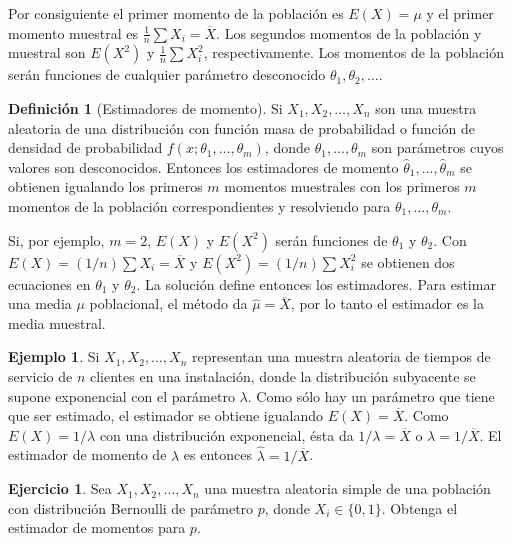 \documentclass[
  11pt,
]{book}
\theoremstyle{definition}
\newtheorem{definition}{Definición}[chapter]
\theoremstyle{definition}
\newtheorem{example}{Ejemplo}[chapter]
\theoremstyle{definition}
\newtheorem{exercise}{Ejercicio}[chapter]
\theoremstyle{definition}
\theoremstyle{remark}
\begin{document}
Por consiguiente el primer momento de la población es \(E(X) = \mu\) y el primer momento muestral es \(\frac{1}{n} \sum X_i = \overline{X}\). Los segundos momentos de la población y muestral son \(E(X^2)\) y \(\frac{1}{n} \sum X_i^2\), respectivamente. Los momentos de la población serán funciones de cualquier parámetro desconocido \(\theta_1, \theta_2, \ldots\).

\begin{definition}[Estimadores de momento]
Si \(X_1, X_2, \ldots, X_n\) son una muestra aleatoria de una distribución con función masa de probabilidad o función de densidad de probabilidad \(f(x; \theta_1, \ldots, \theta_m)\), donde \(\theta_1, \ldots, \theta_m\) son parámetros cuyos valores son desconocidos. Entonces los estimadores de momento \(\hat{\theta}_1, \ldots, \hat{\theta}_m\) se obtienen igualando los primeros \(m\) momentos muestrales con los primeros \(m\) momentos de la población correspondientes y resolviendo para \(\theta_1, \ldots, \theta_m\).
\end{definition}

Si, por ejemplo, \(m = 2\), \(E(X)\) y \(E(X^2)\) serán funciones de \(\theta_1\) y \(\theta_2\). Con \(E(X) = (1/n) \sum X_i = \overline{X}\) y \(E(X^2) = (1/n) \sum X_i^2\) se obtienen dos ecuaciones en \(\theta_1\) y \(\theta_2\). La solución define entonces los estimadores. Para estimar una media \(\mu\) poblacional, el método da \(\hat{\mu} = \overline{X}\), por lo tanto el estimador es la media muestral.

\begin{example}
Si \(X_1, X_2, \ldots, X_n\) representan una muestra aleatoria de tiempos de servicio de \(n\) clientes en una instalación, donde la distribución subyacente se supone exponencial con el parámetro \(\lambda\). Como sólo hay un parámetro que tiene que ser estimado, el estimador se obtiene igualando \(E(X) = \overline{X}\). Como \(E(X) = 1/\lambda\) con una distribución exponencial, ésta da \(1/\lambda = \overline{X}\) o \(\lambda = 1/\overline{X}\). El estimador de momento de \(\lambda\) es entonces \(\hat{\lambda} = 1/\overline{X}\).
\end{example}

\begin{exercise}
Sea \(X_1, X_2, \dots, X_n\) una muestra aleatoria simple de una población con distribución Bernoulli de parámetro \(p\), donde \(X_i \in \{0, 1\}\). Obtenga el estimador de momentos para \(p\).
\end{exercise}
\end{document}
